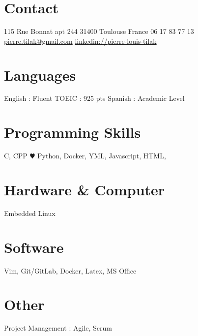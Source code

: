 \documentclass[a4paper]{friggeri-cv} %
\begin{document}


\begin{aside} %
\section{Contact}
115 Rue Bonnat apt 244
31400 Toulouse
France
06 17 83 77 13
~
\href{mailto:pierre.tilak@gmail.com}{pierre.tilak@gmail.com}
\href{https://www.linkedin.com/pub/pierre-louis-tilak/96/162/a83}{linkedin://pierre-louis-tilak}
\section{Languages}
English : Fluent
TOEIC : 925 pts 
Spanish : Academic Level\bigskip\bigskip
\section{Programming Skills}
C, CPP
{\color{red} $\varheartsuit$} Python, 
Docker, YML,
Javascript,
HTML,\bigskip\bigskip
\section{Hardware \& Computer}
Embedded Linux\bigskip\bigskip
\section{Software}
Vim, Git/GitLab, Docker, Latex, MS Office\bigskip\bigskip
\section{Other}
Project Management : Agile, Scrum	
\end{aside}

\end{document}
